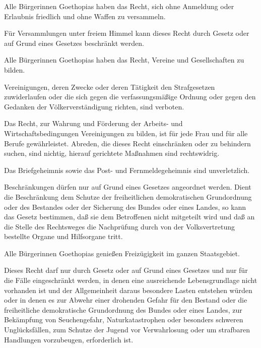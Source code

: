 \documentclass{sasbase}
\begin{document}
\begin{article}[Versammlungsfreiheit]
	\item Alle B\"{u}rgerinnen Goethopias haben das Recht, sich ohne Anmeldung oder Erlaubnis friedlich und ohne Waffen zu versammeln.
	\item Für Versammlungen unter freiem Himmel kann dieses Recht durch Gesetz oder auf Grund eines Gesetzes beschränkt werden.
\end{article}

\begin{article}[Vereinsfreiheit]
	\item Alle B\"{u}rgerinnen Goethopias haben das Recht, Vereine und Gesellschaften zu bilden.
	\item Vereinigungen, deren Zwecke oder deren Tätigkeit den Strafgesetzen zuwiderlaufen oder die sich gegen die verfassungsmäßige Ordnung oder gegen den Gedanken der Völkerverständigung richten, sind verboten.
	\item Das Recht, zur Wahrung und Förderung der Arbeits- und Wirtschaftsbedingungen Vereinigungen zu bilden, ist für jede Frau und für alle Berufe gewährleistet. Abreden, die dieses Recht einschränken oder zu behindern suchen, sind nichtig, hierauf gerichtete Maßnahmen sind rechtswidrig.
\end{article}

\begin{article}[Briefgeheimnis]
	\item Das Briefgeheimnis sowie das Post- und Fernmeldegeheimnis sind unverletzlich.
	\item Beschränkungen dürfen nur auf Grund eines Gesetzes angeordnet werden. Dient die Beschränkung dem Schutze der freiheitlichen demokratischen Grundordnung oder des Bestandes oder der Sicherung des Bundes oder eines Landes, so kann das Gesetz bestimmen, daß sie dem Betroffenen nicht mitgeteilt wird und daß an die Stelle des Rechtsweges die Nachprüfung durch von der Volksvertretung bestellte Organe und Hilfsorgane tritt.
\end{article}

\begin{article}
	\item Alle B\"{u}rgerinnen Goethopias genießen Freizügigkeit im ganzen Staatsgebiet.
	\item Dieses Recht darf nur durch Gesetz oder auf Grund eines Gesetzes und nur für die Fälle eingeschränkt werden, in denen eine ausreichende Lebensgrundlage nicht vorhanden ist und der Allgemeinheit daraus besondere Lasten entstehen würden oder in denen es zur Abwehr einer drohenden Gefahr für den Bestand oder die freiheitliche demokratische Grundordnung des Bundes oder eines Landes, zur Bekämpfung von Seuchengefahr, Naturkatastrophen oder besonders schweren Unglücksfällen, zum Schutze der Jugend vor Verwahrlosung oder um strafbaren Handlungen vorzubeugen, erforderlich ist.
\end{article}
\end{document}
